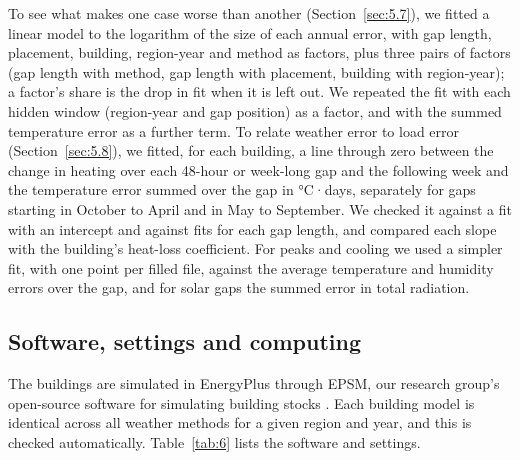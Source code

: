 To see what makes one case worse than another (Section~\ref{sec:5.7}), we fitted a linear model to the logarithm of the size of each annual error, with gap length, placement, building, region-year and method as factors, plus three pairs of factors (gap length with method, gap length with placement, building with region-year); a factor's share is the drop in fit when it is left out. We repeated the fit with each hidden window (region-year and gap position) as a factor, and with the summed temperature error as a further term. To relate weather error to load error (Section~\ref{sec:5.8}), we fitted, for each building, a line through zero between the change in heating over each 48-hour or week-long gap and the following week and the temperature error summed over the gap in °C·days, separately for gaps starting in October to April and in May to September. We checked it against a fit with an intercept and against fits for each gap length, and compared each slope with the building's heat-loss coefficient. For peaks and cooling we used a simpler fit, with one point per filled file, against the average temperature and humidity errors over the gap, and for solar gaps the summed error in total radiation.

\subsection{Software, settings and computing}\label{sec:4.7}

The buildings are simulated in EnergyPlus \citep{crawley2001} through EPSM, our research group's open-source software for simulating building stocks \citep{sbchalmers2026}. Each building model is identical across all weather methods for a given region and year, and this is checked automatically. Table~\ref{tab:6} lists the software and settings.

